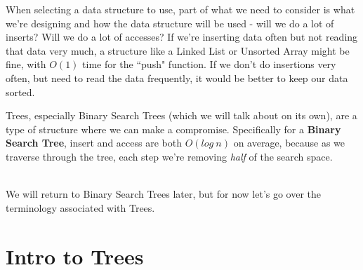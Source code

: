 \documentclass[a4paper,12pt,oneside]{book}
\begin{document}
    When selecting a data structure to use, part of what we need to consider
    is what we're designing and how the data structure will be used -
    will we do a lot of inserts? Will we do a lot of accesses?
    If we're inserting data often but not reading that data very much,
    a structure like a Linked List or Unsorted Array might be fine,
    with $O(1)$ time for the ``push" function. If we don't do
    insertions very often, but need to read the data frequently,
    it would be better to keep our data sorted.

    \begin{center}
    \end{center}

    Trees, especially Binary Search Trees (which we will talk about on its own),
    are a type of structure where we can make a compromise. Specifically
    for a \textbf{Binary Search Tree}, insert and access are both $O(log\ n)$
    on average, because as we traverse through the tree, each step we're
    removing \textit{half} of the search space.

    ~\\
    We will return to Binary Search Trees later, but for now let's go
    over the terminology associated with Trees.

    \section{Intro to Trees}
\end{document}
